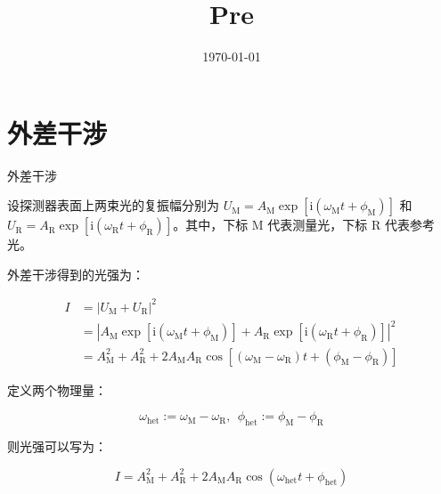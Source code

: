\documentclass{beamer}
\title{Pre}
\institute{兰州大学物理科学与技术学院}
\date{\today}
\begin{document}
\songti
\maketitle
\footnotesize

\section{外差干涉}
\begin{frame}{外差干涉}
    \footnotesize
    
设探测器表面上两束光的复振幅分别为 $U_{\mathrm{M}}=A_{\mathrm{M}}\exp\left[\mathrm{i}\left(\omega_{\mathrm{M}}t+\phi_{\mathrm{M}} \right)  \right] $ 和 $U_{\mathrm{R}}=A_{\mathrm{R}}\exp\left[\mathrm{i}\left(\omega_{\mathrm{R}}t+\phi_{\mathrm{R}}\right)  \right] $。其中，下标 $\mathrm{M} $ 代表测量光，下标 $\mathrm{R} $ 代表参考光。

外差干涉得到的光强为：

$$
\begin{aligned}
I
&=|U_{\mathrm{M}}+U_{\mathrm{R}} |^2 \\
&=\left|A_{\mathrm{M}}\exp\left[\mathrm{i}\left(\omega_{\mathrm{M}}t+\phi_{\mathrm{M}} \right)  \right] + A_{\mathrm{R}}\exp\left[\mathrm{i}\left(\omega_{\mathrm{R}}t+\phi_{\mathrm{R}}\right)  \right] \right|^2 \\
&=A_{\mathrm{M}}^2 + A_{\mathrm{R}}^2 + 2A_{\mathrm{M}}A_{\mathrm{R}}\cos[(\omega_{\mathrm{M}} - \omega_{\mathrm{R}})t + (\phi_{\mathrm{M}}-\phi_{\mathrm{R}})]
\end{aligned}
$$

定义两个物理量：

$$
\omega_{\mathrm{het}}
:=\omega_{\mathrm{M}} - \omega_{\mathrm{R}},~~
\phi_{\mathrm{het}}
:=\phi_{\mathrm{M}} - \phi_{\mathrm{R}}
$$

则光强可以写为：

$$
I
=A_{\mathrm{M}}^2 + A_{\mathrm{R}}^2 + 2A_{\mathrm{M}}A_{\mathrm{R}}\cos(\omega_{\mathrm{het}}t+\phi_{\mathrm{het}})
$$

\end{frame}
\end{document}
